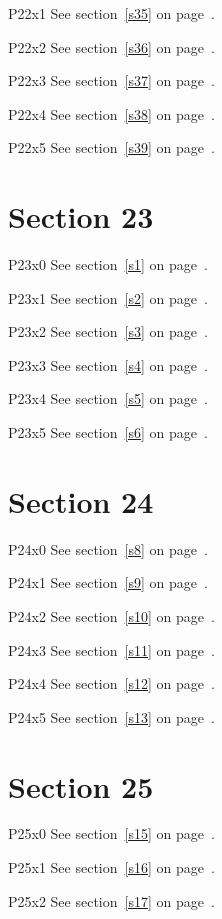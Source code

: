 P22x1 \w\w\w\w\w\w See section~\ref{s35} on page~\pageref{s27}.

P22x2 \w\w\w\w\w\w See section~\ref{s36} on page~\pageref{s28}.

P22x3 \w\w\w\w\w\w See section~\ref{s37} on page~\pageref{s29}.

P22x4 \w\w\w\w\w\w See section~\ref{s38} on page~\pageref{s30}.

P22x5 \w\w\w\w\w\w See section~\ref{s39} on page~\pageref{s31}.

\section{Section 23}\label{s23}
P23x0 \w\w\w\w\w\w See section~\ref{s1} on page~\pageref{s29}.

P23x1 \w\w\w\w\w\w See section~\ref{s2} on page~\pageref{s30}.

P23x2 \w\w\w\w\w\w See section~\ref{s3} on page~\pageref{s31}.

P23x3 \w\w\w\w\w\w See section~\ref{s4} on page~\pageref{s32}.

P23x4 \w\w\w\w\w\w See section~\ref{s5} on page~\pageref{s33}.

P23x5 \w\w\w\w\w\w See section~\ref{s6} on page~\pageref{s34}.

\section{Section 24}\label{s24}
P24x0 \w\w\w\w\w\w See section~\ref{s8} on page~\pageref{s32}.

P24x1 \w\w\w\w\w\w See section~\ref{s9} on page~\pageref{s33}.

P24x2 \w\w\w\w\w\w See section~\ref{s10} on page~\pageref{s34}.

P24x3 \w\w\w\w\w\w See section~\ref{s11} on page~\pageref{s35}.

P24x4 \w\w\w\w\w\w See section~\ref{s12} on page~\pageref{s36}.

P24x5 \w\w\w\w\w\w See section~\ref{s13} on page~\pageref{s37}.

\section{Section 25}\label{s25}
P25x0 \w\w\w\w\w\w See section~\ref{s15} on page~\pageref{s35}.

P25x1 \w\w\w\w\w\w See section~\ref{s16} on page~\pageref{s36}.

P25x2 \w\w\w\w\w\w See section~\ref{s17} on page~\pageref{s37}.

